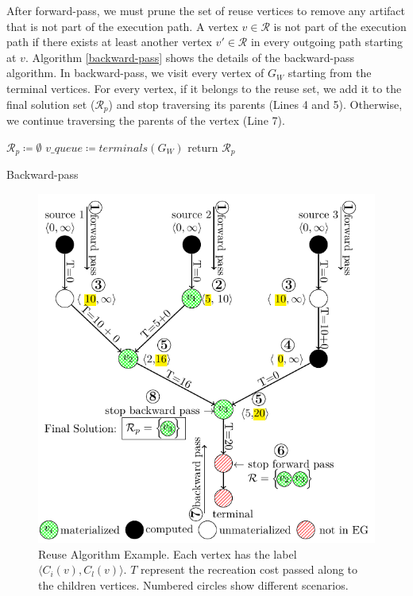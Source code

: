 After forward-pass, we must prune the set of reuse vertices to remove any artifact that is not part of the execution path.
A vertex $v \in \mathcal{R}$ is not part of the execution path if there exists at least another vertex $v' \in \mathcal{R}$ in every outgoing path starting at $v$.
Algorithm \ref{backward-pass} shows the details of the backward-pass algorithm.
In backward-pass, we visit every vertex of $G_W$ starting from the terminal vertices.
For every vertex, if it belongs to the reuse set, we add it to the final solution set ($\mathcal{R}_p$) and stop traversing its parents (Lines 4 and 5).
Otherwise, we continue traversing the parents of the vertex (Line 7).
\begin{algorithm}[h]
$\mathcal{R}_p \coloneqq \emptyset$\;
$v\_queue \coloneqq terminals(G_W)$\;
return $\mathcal{R}_p$\;
\caption{Backward-pass}\label{backward-pass}
\end{algorithm}
\begin{figure}[t]
\centering
\includegraphics[width=\linewidth]{../images/tikz-standalone/reuse-algorithm}
\caption{Reuse Algorithm Example. Each vertex has the label $\langle C_i(v),C_l(v) \rangle$. $T$ represent the recreation cost passed along to the children vertices. Numbered circles show different scenarios.}
\label{fig-reuse-algorithm}
\vspace{-4mm}
\end{figure}
